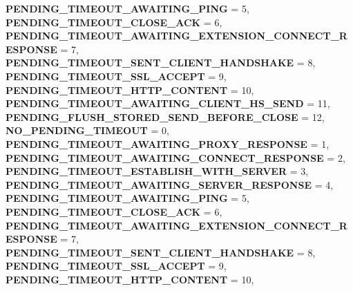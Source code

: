\begin{DoxyCompactItemize}
{\bfseries P\+E\+N\+D\+I\+N\+G\+\_\+\+T\+I\+M\+E\+O\+U\+T\+\_\+\+A\+W\+A\+I\+T\+I\+N\+G\+\_\+\+P\+I\+NG} = 5, 
{\bfseries P\+E\+N\+D\+I\+N\+G\+\_\+\+T\+I\+M\+E\+O\+U\+T\+\_\+\+C\+L\+O\+S\+E\+\_\+\+A\+CK} = 6, 
{\bfseries P\+E\+N\+D\+I\+N\+G\+\_\+\+T\+I\+M\+E\+O\+U\+T\+\_\+\+A\+W\+A\+I\+T\+I\+N\+G\+\_\+\+E\+X\+T\+E\+N\+S\+I\+O\+N\+\_\+\+C\+O\+N\+N\+E\+C\+T\+\_\+\+R\+E\+S\+P\+O\+N\+SE} = 7, 
\newline
{\bfseries P\+E\+N\+D\+I\+N\+G\+\_\+\+T\+I\+M\+E\+O\+U\+T\+\_\+\+S\+E\+N\+T\+\_\+\+C\+L\+I\+E\+N\+T\+\_\+\+H\+A\+N\+D\+S\+H\+A\+KE} = 8, 
{\bfseries P\+E\+N\+D\+I\+N\+G\+\_\+\+T\+I\+M\+E\+O\+U\+T\+\_\+\+S\+S\+L\+\_\+\+A\+C\+C\+E\+PT} = 9, 
{\bfseries P\+E\+N\+D\+I\+N\+G\+\_\+\+T\+I\+M\+E\+O\+U\+T\+\_\+\+H\+T\+T\+P\+\_\+\+C\+O\+N\+T\+E\+NT} = 10, 
{\bfseries P\+E\+N\+D\+I\+N\+G\+\_\+\+T\+I\+M\+E\+O\+U\+T\+\_\+\+A\+W\+A\+I\+T\+I\+N\+G\+\_\+\+C\+L\+I\+E\+N\+T\+\_\+\+H\+S\+\_\+\+S\+E\+ND} = 11, 
\newline
{\bfseries P\+E\+N\+D\+I\+N\+G\+\_\+\+F\+L\+U\+S\+H\+\_\+\+S\+T\+O\+R\+E\+D\+\_\+\+S\+E\+N\+D\+\_\+\+B\+E\+F\+O\+R\+E\+\_\+\+C\+L\+O\+SE} = 12, 
{\bfseries N\+O\+\_\+\+P\+E\+N\+D\+I\+N\+G\+\_\+\+T\+I\+M\+E\+O\+UT} = 0, 
{\bfseries P\+E\+N\+D\+I\+N\+G\+\_\+\+T\+I\+M\+E\+O\+U\+T\+\_\+\+A\+W\+A\+I\+T\+I\+N\+G\+\_\+\+P\+R\+O\+X\+Y\+\_\+\+R\+E\+S\+P\+O\+N\+SE} = 1, 
{\bfseries P\+E\+N\+D\+I\+N\+G\+\_\+\+T\+I\+M\+E\+O\+U\+T\+\_\+\+A\+W\+A\+I\+T\+I\+N\+G\+\_\+\+C\+O\+N\+N\+E\+C\+T\+\_\+\+R\+E\+S\+P\+O\+N\+SE} = 2, 
\newline
{\bfseries P\+E\+N\+D\+I\+N\+G\+\_\+\+T\+I\+M\+E\+O\+U\+T\+\_\+\+E\+S\+T\+A\+B\+L\+I\+S\+H\+\_\+\+W\+I\+T\+H\+\_\+\+S\+E\+R\+V\+ER} = 3, 
{\bfseries P\+E\+N\+D\+I\+N\+G\+\_\+\+T\+I\+M\+E\+O\+U\+T\+\_\+\+A\+W\+A\+I\+T\+I\+N\+G\+\_\+\+S\+E\+R\+V\+E\+R\+\_\+\+R\+E\+S\+P\+O\+N\+SE} = 4, 
{\bfseries P\+E\+N\+D\+I\+N\+G\+\_\+\+T\+I\+M\+E\+O\+U\+T\+\_\+\+A\+W\+A\+I\+T\+I\+N\+G\+\_\+\+P\+I\+NG} = 5, 
{\bfseries P\+E\+N\+D\+I\+N\+G\+\_\+\+T\+I\+M\+E\+O\+U\+T\+\_\+\+C\+L\+O\+S\+E\+\_\+\+A\+CK} = 6, 
\newline
{\bfseries P\+E\+N\+D\+I\+N\+G\+\_\+\+T\+I\+M\+E\+O\+U\+T\+\_\+\+A\+W\+A\+I\+T\+I\+N\+G\+\_\+\+E\+X\+T\+E\+N\+S\+I\+O\+N\+\_\+\+C\+O\+N\+N\+E\+C\+T\+\_\+\+R\+E\+S\+P\+O\+N\+SE} = 7, 
{\bfseries P\+E\+N\+D\+I\+N\+G\+\_\+\+T\+I\+M\+E\+O\+U\+T\+\_\+\+S\+E\+N\+T\+\_\+\+C\+L\+I\+E\+N\+T\+\_\+\+H\+A\+N\+D\+S\+H\+A\+KE} = 8, 
{\bfseries P\+E\+N\+D\+I\+N\+G\+\_\+\+T\+I\+M\+E\+O\+U\+T\+\_\+\+S\+S\+L\+\_\+\+A\+C\+C\+E\+PT} = 9, 
{\bfseries P\+E\+N\+D\+I\+N\+G\+\_\+\+T\+I\+M\+E\+O\+U\+T\+\_\+\+H\+T\+T\+P\+\_\+\+C\+O\+N\+T\+E\+NT} = 10, 

\end{DoxyCompactItemize}
